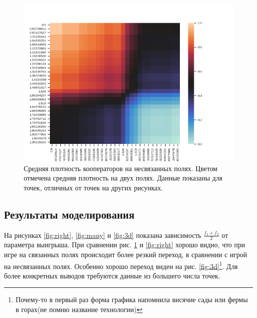 \documentclass[12pt]{article}
\begin{document}
    \begin{figure}[H]
         \centering
         \includegraphics[width=0.95\columnwidth, keepaspectratio=True]{DoubleField/wrong.png}
         \caption{Средняя плотность кооператоров на несвязанных полях. Цветом отмечена средняя плотность на двух полях. Данные показаны для точек, отличных от точек на других рисунках.}
         \label{fig:wrong}
    \end{figure}

\subsection{Результаты моделирования}
    На рисунках \ref{fig:right}, \ref{fig:many} и \ref{fig:3d} показана зависимость $\frac{f_1+f_2}{2}$ от параметра выигрыша. 
    При сравнении рис. \ref{fig:wrong} и \ref{fig:right} хорошо видно, что при игре на связанных полях происходит более резкий переход, в сравнении с игрой на несвязанных полях. Особенно хорошо переход виден на рис. \ref{fig:3d}\footnote{Почему-то в первый раз форма графика напомнила висячие сады или фермы в горах(не помню название технологии)}. Для более конкретных выводов требуются данные из большего числа точек.
    
\end{document}
